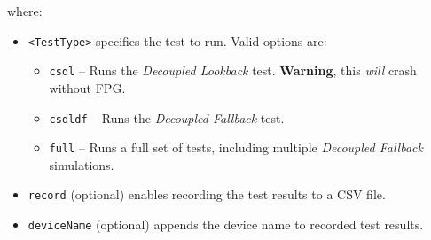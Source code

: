 \documentclass[sigconf]{acmart}
\begin{document}
where:
\begin{itemize}
    \item \texttt{<TestType>} specifies the test to run. Valid options are:
    \begin{itemize}
        \item \texttt{csdl} – Runs the \emph{Decoupled Lookback} test. \textbf{Warning}, this \emph{will} crash without FPG. 
        \item \texttt{csdldf} – Runs the \emph{Decoupled Fallback} test.
        \item \texttt{full} – Runs a full set of tests, including multiple \emph{Decoupled Fallback} simulations.
    \end{itemize}
    \item \texttt{record} (optional) enables recording the test results to a CSV file.
    \item \texttt{deviceName} (optional) appends the device name to recorded test results.
\end{itemize}
\end{document}

